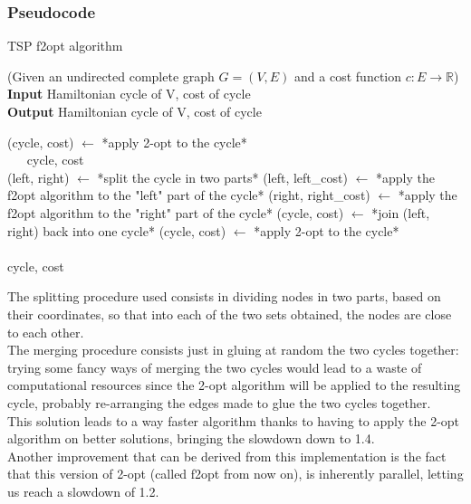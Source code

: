 \subsubsection{Pseudocode}
\begin{algorithm}
    \caption{TSP f2opt algorithm}
    (Given an undirected complete graph $G=(V,E)$ and a cost function $c:E\rightarrow\mathbb{R}$)\\

    \textbf{Input} Hamiltonian cycle of V, cost of cycle\\
    \textbf{Output} Hamiltonian cycle of V, cost of cycle\\
    \begin{algorithmic}

            \State (cycle, cost) $\gets$ *apply 2-opt to the cycle*\\
            $\quad\;\;$\Return cycle, cost
        \EndIf\\

            \State (left, right) $\gets$ *split the cycle in two parts*
            \State (left, left\_cost) $\gets$ *apply the f2opt algorithm to the "left" part of the cycle*
            \State (right, right\_cost) $\gets$ *apply the f2opt algorithm to the "right" part of the cycle*
            \State (cycle, cost) $\gets$ *join (left, right) back into one cycle*
            \State (cycle, cost) $\gets$ *apply 2-opt to the cycle*
        \EndWhile\\\\

        \Return cycle, cost

    \end{algorithmic}
\end{algorithm}

The splitting procedure used consists in dividing nodes in two parts, based on their coordinates, so that into each of the two sets obtained, the nodes are close to each other.\\
The merging procedure consists just in gluing at random the two cycles together: trying some fancy ways of merging the two cycles would lead to a waste of computational resources since the 2-opt algorithm will be applied to the resulting cycle, probably re-arranging the edges made to glue the two cycles together.\\

This solution leads to a way faster algorithm thanks to having to apply the 2-opt algorithm on better solutions, bringing the slowdown down to 1.4.\\
Another improvement that can be derived from this implementation is the fact that this version of 2-opt (called f2opt from now on), is inherently parallel, letting us reach a slowdown of 1.2.

